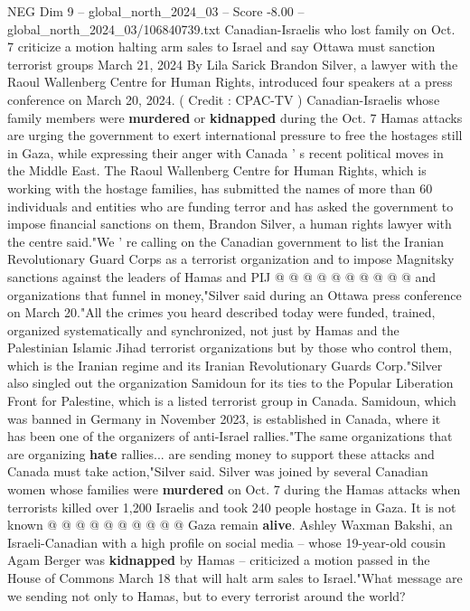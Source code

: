 \begin{textsample}{NEG Dim 9 – global\_north\_2024\_03 – Score -8.00 – global\_north\_2024\_03/106840739.txt}  \label{ex:f9_neg_242}
Canadian-Israelis who lost family on Oct. 7 criticize a motion halting arm sales to Israel and say Ottawa must sanction terrorist groups March 21, 2024 By Lila Sarick Brandon Silver, a lawyer with the Raoul Wallenberg Centre for Human Rights, introduced four speakers at a press conference on March 20, 2024. ( Credit : CPAC-TV ) Canadian-Israelis whose family members were \textbf{murdered} or \textbf{kidnapped} during the Oct. 7 Hamas attacks are urging the government to exert international pressure to free the hostages still in Gaza, while expressing their anger with Canada ' s recent political moves in the Middle East.
The Raoul Wallenberg Centre for Human Rights, which is working with the hostage families, has submitted the names of more than 60 individuals and entities who are funding terror and has asked the government to impose financial sanctions on them, Brandon Silver, a human rights lawyer with the centre said."We ' re calling on the Canadian government to list the Iranian Revolutionary Guard Corps as a terrorist organization and to impose Magnitsky sanctions against the leaders of Hamas and PIJ @ @ @ @ @ @ @ @ @ @ and organizations that funnel in money,"Silver said during an Ottawa press conference on March 20."All the crimes you heard described today were funded, trained, organized systematically and synchronized, not just by Hamas and the Palestinian Islamic Jihad terrorist organizations but by those who control them, which is the Iranian regime and its Iranian Revolutionary Guards Corp."Silver also singled out the organization Samidoun for its ties to the Popular Liberation Front for Palestine, which is a listed terrorist group in Canada.
Samidoun, which was banned in Germany in November 2023, is established in Canada, where it has been one of the organizers of anti-Israel rallies."The same organizations that are organizing \textbf{hate} rallies... are sending money to support these attacks and Canada must take action,"Silver said.
Silver was joined by several Canadian women whose families were \textbf{murdered} on Oct. 7 during the Hamas attacks when terrorists killed over 1,200 Israelis and took 240 people hostage in Gaza.
It is not known @ @ @ @ @ @ @ @ @ @ Gaza remain \textbf{alive}.
Ashley Waxman Bakshi, an Israeli-Canadian with a high profile on social media -- whose 19-year-old cousin Agam Berger was \textbf{kidnapped} by Hamas -- criticized a motion passed in the House of Commons March 18 that will halt arm sales to Israel."What message are we sending not only to Hamas, but to every terrorist around the world?

\end{textsample}
